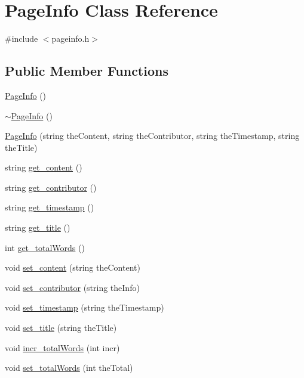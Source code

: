 \hypertarget{class_page_info}{}\section{Page\+Info Class Reference}
\label{class_page_info}


{\ttfamily \#include $<$pageinfo.\+h$>$}

\subsection*{Public Member Functions}
\begin{DoxyCompactItemize}
\item 
\hyperlink{class_page_info_a3ab3b93ca3b3d09645d5e187863b84e6}{Page\+Info} ()
\item 
\hyperlink{class_page_info_a45259793eed3f830dadecfde0e970ec5}{$\sim$\+Page\+Info} ()
\item 
\hyperlink{class_page_info_aa98a49dd45fdea434a27e4892dbdf032}{Page\+Info} (string the\+Content, string the\+Contributor, string the\+Timestamp, string the\+Title)
\item 
string \hyperlink{class_page_info_a61bd04fcecb67f3fac9833cd4a0e432b}{get\+\_\+content} ()
\item 
string \hyperlink{class_page_info_a6569fb1fd2a7efa4a6d144aa87c27912}{get\+\_\+contributor} ()
\item 
string \hyperlink{class_page_info_ab2fa01ac638b965912b93fce36d4899a}{get\+\_\+timestamp} ()
\item 
string \hyperlink{class_page_info_a0985d632ae64c913fe976bedccaf5d31}{get\+\_\+title} ()
\item 
int \hyperlink{class_page_info_a40938f3d2f1c81079abcbe8051143d53}{get\+\_\+total\+Words} ()
\item 
void \hyperlink{class_page_info_afaf6005be3e5fa629619038a96fbd1af}{set\+\_\+content} (string the\+Content)
\item 
void \hyperlink{class_page_info_afb03f9cd31ec6e6f500393cd5c7e1037}{set\+\_\+contributor} (string the\+Info)
\item 
void \hyperlink{class_page_info_ad8f8aada94adc772c9739f5dcb3223a7}{set\+\_\+timestamp} (string the\+Timestamp)
\item 
void \hyperlink{class_page_info_a0808f61697bbeca2d717d9b55b233ae1}{set\+\_\+title} (string the\+Title)
\item 
void \hyperlink{class_page_info_a43de865e72ac2fc61f124e2acee9da4d}{incr\+\_\+total\+Words} (int incr)
\item 
void \hyperlink{class_page_info_adcd293f9d6bdc291f7f28663e7151c45}{set\+\_\+total\+Words} (int the\+Total)
\end{DoxyCompactItemize}
